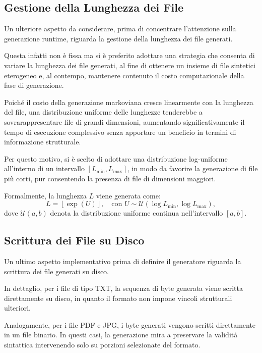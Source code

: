 \documentclass{report}
\begin{document}
\subsection{Gestione della Lunghezza dei File}

Un ulteriore aspetto da considerare, prima di concentrare l'attenzione sulla generazione runtime,
riguarda la gestione della lunghezza dei file generati.

Questa infatti non è fissa ma si è preferito
adottare una strategia che consenta di variare la lunghezza dei file generati, al fine di
ottenere un insieme di file sintetici eterogeneo e, al contempo, mantenere
contenuto il costo computazionale della fase di generazione.

\bigskip

Poiché il costo della generazione markoviana cresce linearmente con la lunghezza
del file, una distribuzione uniforme delle lunghezze tenderebbe a sovrarappresentare
file di grandi dimensioni, aumentando significativamente il tempo di esecuzione
complessivo senza apportare un beneficio in termini di informazione
strutturale.

\bigskip

Per questo motivo, si è scelto di adottare una distribuzione log-uniforme all'interno 
di un intervallo \([L_{\min}, L_{\max}]\), in modo da favorire la generazione di file più corti,
pur consentendo la presenza di file di dimensioni maggiori.

\bigskip

Formalmente, la lunghezza \(L\) viene generata come:
\[
L = \left\lfloor \exp(U) \right\rfloor,
\quad \text{con } U \sim \mathcal{U}(\log L_{\min}, \log L_{\max}),
\]
dove \(\mathcal{U}(a,b)\) denota la distribuzione uniforme continua
nell'intervallo \([a,b]\).


\subsection{Scrittura dei File su Disco}

Un ultimo aspetto implementativo prima di definire il generatore riguarda la scrittura dei file generati su disco.

\bigskip

In dettaglio, per i file di tipo TXT, la sequenza di byte generata viene scritta direttamente
su disco, in quanto il formato non impone vincoli strutturali ulteriori.

Analogamente, per i file PDF e JPG, i byte generati vengono scritti direttamente
in un file binario. In questi casi, la generazione mira a preservare 
la validità sintattica intervenendo solo su porzioni selezionate del formato.
\end{document}
